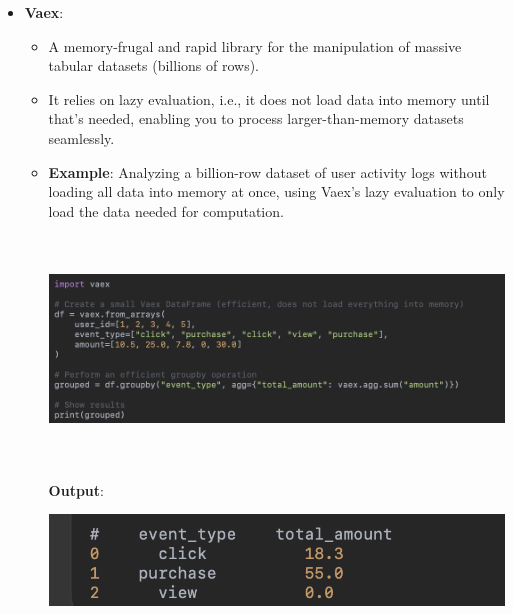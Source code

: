 \documentclass{article}
\begin{document}
\begin{itemize}
\newpage
\item \textbf{Vaex}:
\begin{itemize}
\item A memory-frugal and rapid library for the manipulation of massive tabular datasets (billions of rows).
\item It relies on lazy evaluation, i.e., it does not load data into memory until that's needed, enabling you to process larger-than-memory datasets seamlessly.
\item\textbf{Example}: Analyzing a billion-row dataset of user activity logs without loading all data into memory at once, using Vaex’s lazy evaluation to only load the data needed for computation.

\includegraphics[width=14cm,height=6cm]{Vaex.png}

\textbf{Output}:

\includegraphics[width=14cm,height=2
cm]{Vaex_Output.png}
\end{itemize}
\end{itemize}
\end{document}
